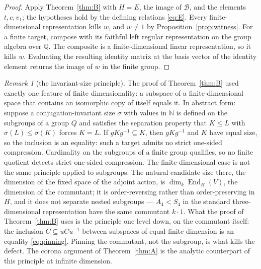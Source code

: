 \documentclass[11pt]{amsart}
\newcommand{\leanverified}[2]{\ignorespaces}
\theoremstyle{definition}
\theoremstyle{remark}
\newtheorem{remark}[theorem]{Remark}
\theoremstyle{plain}
\newcommand{\End}{\operatorname{End}}
\begin{document}
\begin{proof}
Apply Theorem~\ref{thm:B} with $H=E$, the image of $\mathcal B$, and the
elements $t,c,v_1$; the hypotheses hold by the defining relations
\eqref{eq:E}.  Every finite-dimensional representation kills $w$, and
$w\neq1$ by Proposition~\ref{prop:witness}.  For a finite target, compose
with its faithful left regular representation on the group algebra over
$\mathbb Q$.  The composite is a finite-dimensional linear
representation, so it kills $w$.  Evaluating the resulting identity
matrix at the basis vector of the identity element returns the image
of $w$ in the finite group.
\end{proof}

\begin{remark}[the invariant-size principle]\label{rem:invariantsize}
The proof of Theorem~\ref{thm:B} used exactly one feature of finite
dimensionality: a subspace of a finite-dimensional space that contains
an isomorphic copy of itself equals it.  In abstract form: suppose a
conjugation-invariant size
$\sigma$ with values in $\mathbb N$ is defined on the subgroups of a
group $Q$ and satisfies the separation property that $K\le L$ with
$\sigma(L)\le\sigma(K)$ forces $K=L$.  If $gKg^{-1}\subseteq K$, then
$gKg^{-1}$ and $K$ have equal size, so the inclusion is an equality:
such a target admits no strict one-sided compression.
\leanverified{Sofic/ManuscriptExactWrappers}{GroupApproximation.ManuscriptExactWrappers.manuscriptInvariantSizePrinciple}
Cardinality on the subgroups of a finite group qualifies, so no finite
quotient detects strict one-sided compression.  The finite-dimensional
case is not the same principle applied to subgroups.  The natural
candidate size there, the dimension of the fixed space of the adjoint
action, is $\dim_k\End_H(V)$, the dimension of the commutant; it is
order-reversing rather than order-preserving in $H$, and it does not
separate nested subgroups --- $A_4<S_4$ in the standard
three-dimensional representation have the same commutant $k\cdot1$.
What the proof of Theorem~\ref{thm:B} uses is the principle one level
down, on the commutant itself: the inclusion $C\subseteq uCu^{-1}$
between subspaces of equal finite dimension is an equality
\eqref{eq:pinning}.  Pinning the commutant, not the subgroup, is what
kills the defect.  The corona argument of Theorem~\ref{thm:A}
is the analytic counterpart of this principle at infinite dimension.
\end{remark}
\end{document}
